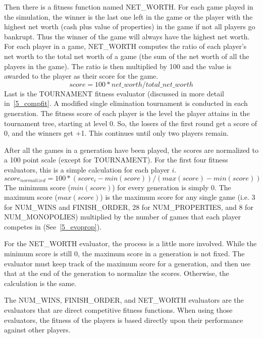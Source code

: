 Then there is a fitness function named NET\_WORTH. For each game played in the
simulation, the winner is the last one left in the game or the player with the
highest net worth (cash plus value of properties) in the game if not all players
go bankrupt. Thus the winner of the game will always have the highest net worth.
For each player in a game, NET\_WORTH computes the ratio of each player's net
worth to the total net worth of a game (the sum of the net worth of all the
players in the game). The ratio is then multiplied by 100 and the value is
awarded to the player as their score for the game.
\begin{equation*}
score = 100 * net\_worth / total\_net\_worth
\end{equation*}
Last is the TOURNAMENT fitness evaluator (discussed in more detail
in~\ref{5_compfit}. A modified single elimination tournament is conducted in
each generation. The fitness score of each player is the level the player
attains in the tournament tree, starting at level 0. So, the losers of the first
round get a score of 0, and the winners get +1. This continues until only two
players remain.

After all the games in a generation have been played, the scores are normalized
to a 100 point scale (except for TOURNAMENT). For the first four fitness
evaluators, this is a simple calculation for each player \(i\).
\begin{equation*}
score_{normalized} = 100 * (score_i - min(score)) / (max(score) - min(score))
\end{equation*}
The minimum score (\(min(score)\)) for every generation is simply 0. The maximum
score (\(max(score)\)) is the maximum score for any single game (i.e. 3 for NUM\_WINS
and FINISH\_ORDER, 28 for NUM\_PROPERTIES, and 8 for NUM\_MONOPOLIES) multiplied
by the number of games that each player competes in (See~\ref{5_evoprop}). 

For the NET\_WORTH evaluator, the process is a little more involved. While the
minimum score is still 0, the maximum score in a generation is not fixed. The
evaluator must keep track of the maximum score for a generation, and then use
that at the end of the generation to normalize the scores. Otherwise, the
calculation is the same.

The NUM\_WINS, FINISH\_ORDER, and NET\_WORTH evaluators are the evaluators that
are direct competitive fitness functions. When using those evaluators, the
fitness of the players is based directly upon their performance against other
players. 

